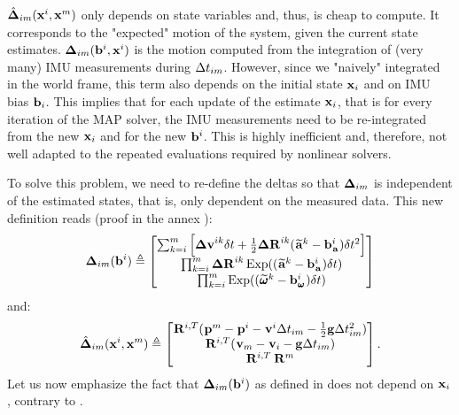 $\hat{{{\bm \Delta}}}_{im}({\bf x}^i, {\bf x}^m)$ only depends on state variables and, thus, is cheap to compute. It corresponds to the "expected" motion of the system, given the current state estimates. 
${{\bm \Delta}}_{im}({\bf b}^i, {\bf x}^i)$ is the motion computed from the integration of (very many) IMU measurements during $\Delta t_{im}$. However, since we "naively" integrated
in the world frame, this term also depends on the initial state ${\bf x}_i$ and on IMU bias ${\bf b}_i$. This implies that for each update of the estimate ${\bf x}_i$, that is for every iteration of the MAP solver, the IMU measurements 
need to be re-integrated from the new ${\bf x}_i$ and for the new ${\bf b}^i$. This is highly inefficient and, therefore, not well adapted to the repeated evaluations required by nonlinear 
solvers.

To solve this problem, we need to re-define the deltas so that ${{\bm \Delta}}_{im}$ is independent of the estimated states, that is, only dependent on the measured data. This new definition 
reads \cite{lupton-09, forster2015imu} (proof in the annex ):
%
\begin{align}
    {{\bm \Delta}}_{im}({\bf b}^i) \triangleq 
    \begin{bmatrix}
    \sum_{k=i}^{m} \Big[{\bm \Delta {\bf v}}^{ik}\delta t +  \frac{1}{2} {\bm \Delta {\bf R}}^{ik} (\prescript{}{}{\widetilde{{\bf a}}}_{}^k - {\bf b}_{\prescript{}{}{{\bf a}}_{}}^i)\delta t^2 \Big] \\
    \prod_{k=i}^{m} {\bm \Delta {\bf R}}^{ik} \operatorname*{Exp}((\prescript{}{}{\widetilde{{\bf a}}}_{}^k - {\bf b}_{\prescript{}{}{{\bf a}}_{}}^i)\delta t)  \\
    \prod_{k=i}^{m} \operatorname*{Exp}((\prescript{}{}{\widetilde{\pmb{\omega}}}_{}^k - {\bf b}_{\prescript{}{}{\pmb{\omega}}_{}}^i)\delta t)  
    \end{bmatrix}
    \label{eq:imu_delta_forster}
\end{align}
%
and:
%
\begin{align}
    \hat{{{\bm \Delta}}}_{im}({\bf x}^i, {\bf x}^m) \triangleq 
    \begin{bmatrix}
    \prescript{}{}{{\bf R}}_{}^{i,T}(\prescript{}{}{{\bf p}}_{}^m - \prescript{}{}{{\bf p}}_{}^i - \prescript{}{}{{\bf v}}_{}^i \Delta t_{im} - \frac{1}{2} {\bf g} \Delta t_{im}^2) \\
    \prescript{}{}{{\bf R}}_{}^{i,T} (\prescript{}{}{{\bf v}}_{m} - \prescript{}{}{{\bf v}}_{i} - {\bf g} \Delta t_{im})  \\
    \prescript{}{}{{\bf R}}_{}^{i,T} \prescript{}{}{{\bf R}}_{}^{m}  
    \end{bmatrix}. 
    \label{eq:boxminus-forster}
\end{align}
%
Let us now emphasize the fact that ${{\bm \Delta}}_{im}({\bf b}^i)$ as defined in  does not depend on ${\bf x}_i$, contrary to . 

